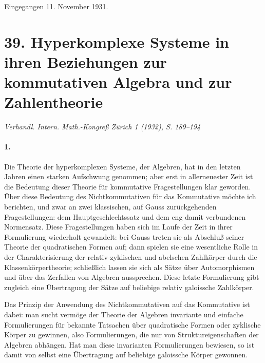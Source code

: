 \documentclass[11pt]{article}
\begin{document}
\begin{center}
Eingegangen 11. November 1931.
\end{center}

\section*{39. Hyperkomplexe Systeme in ihren Beziehungen zur kommutativen Algebra und zur Zahlentheorie}

\begin{center}
\emph{Verhandl. Intern. Math.-Kongreß Zürich 1 (1932), S. 189--194}
\end{center}

\paragraph{1.}
Die Theorie der hyperkomplexen Systeme, der Algebren, hat in den letzten Jahren einen starken Aufschwung genommen; aber erst in allerneuester Zeit ist die Bedeutung dieser Theorie für kommutative Fragestellungen klar geworden. Über diese Bedeutung des Nichtkommutativen für das Kommutative möchte ich berichten, und zwar an zwei klassischen, auf Gauss zurückgehenden Fragestellungen: dem Hauptgeschlechtssatz und dem eng damit verbundenen Normensatz. Diese Fragestellungen haben sich im Laufe der Zeit in ihrer Formulierung wiederholt gewandelt: bei Gauss treten sie als Abschluß seiner Theorie der quadratischen Formen auf; dann spielen sie eine wesentliche Rolle in der Charakterisierung der relativ-zyklischen und abelschen Zahlkörper durch die Klassenkörpertheorie; schließlich lassen sie sich als Sätze über Automorphismen und über das Zerfallen von Algebren aussprechen. Diese letzte Formulierung gibt zugleich eine Übertragung der Sätze auf beliebige relativ galoissche Zahlkörper.

Das Prinzip der Anwendung des Nichtkommutativen auf das Kommutative ist dabei: man sucht vermöge der Theorie der Algebren invariante und einfache Formulierungen für bekannte Tatsachen über quadratische Formen oder zyklische Körper zu gewinnen, also Formulierungen, die nur von Struktureigenschaften der Algebren abhängen. Hat man diese invarianten Formulierungen bewiesen, so ist damit von selbst eine Übertragung auf beliebige galoissche Körper gewonnen.
\end{document}

